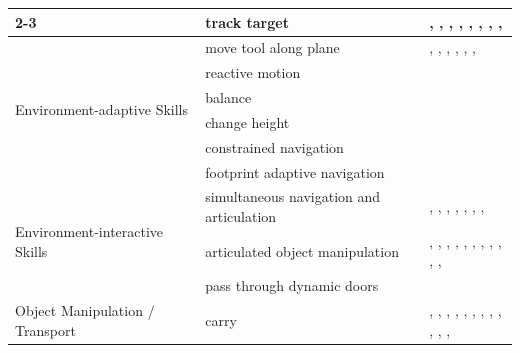 \begin{table}[p]
\begin{tabular}{|p{4cm}|p{5cm}|p{15cm}|}
\cline{2-3}
    & track target                             & \cite{Donald2024AnAF}, \cite{Weser2009AutonomousPF}, \cite{Pedersen2015GestureBasedEO}, \cite{Stckler2009IntegratingIM}, \cite{Kenney2009InteractiveSF}, \cite{Pedersen2014IntuitiveSP}, \cite{Arm2024PedipulateEM}, \cite{Lim2019SkillbasedAA}, \cite{Chang2006ABB} \\
\hline
\multirow{6}{*}{\parbox{4cm}{Environment-adaptive Skills}}
    & move tool along plane                    & \cite{Li2022BEHAVIOR1KAB}, \cite{Huang2013BehaviorB}, \cite{Groth2013MultitaskingOC}, \cite{Li2020PatternAA}, \cite{Lim2008MultipleHC}, \cite{Kotecha2024AHM}, \cite{Fu2024MobileAL} \\
\cline{2-3}
    & reactive motion                          & \cite{Zhao2025ReactiveWL} \\
\cline{2-3}
    & balance                                  & \cite{Schwarz2016HybridDL} \\
\cline{2-3}
    & change height                            & \cite{Ding2022IntelligentAF} \\
\cline{2-3}
    & constrained navigation                   & \cite{Hornung2012NavigationIT} \\
\cline{2-3}
    & footprint adaptive navigation            & \cite{Hornung2012NavigationIT} \\
\hline
\multirow{3}{*}{\parbox{4cm}{Environment-interactive Skills}}
    & simultaneous navigation and articulation & \cite{Scholz2011CartPW}, \cite{Rigo2022ContactOF}, \cite{Stckler2009IntegratingIM}, \cite{Settimi2016MotionPB}, \cite{Confente2025SkinMachineIW}, \cite{Bertoncelli2020LinearTM}, \cite{Dadiotis2025DynamicOG}, \cite{Fu2024MobileAL} \\
\cline{2-3}
    & articulated object manipulation          & \cite{Huang2013BehaviorB}, \cite{Arm2024PedipulateEM}, \cite{Lim2008MultipleHC}, \cite{Huang2023SkillTA}, \cite{Karumanchi2017TeamRS}, \cite{Huang2008ACB}, \cite{Petersson1999AHC}, \cite{Huang2008AnAB}, \cite{engelbracht2024spotlightroboticsceneunderstanding}, \cite{Shan2026DockAnywhereDV}, \cite{Fu2024MobileAL}, \cite{Zhang2025AgentWorldAI} \\
\cline{2-3}
    & pass through dynamic doors               & \cite{Gray2013ASP} \\
\hline
\multirow{5}{*}{\parbox{3cm}{Object Manipulation / Transport}}
    & carry                                    & \cite{Yamazaki2012HomeAssistantRF}, \cite{Ding2022IntelligentAF}, \cite{Arm2024PedipulateEM}, \cite{Lee2018PlanningAC}, \cite{Stuckler2012RoboCupHomeDE}, \cite{Cohen2012SearchbasedPF}, \cite{Lim2008MultipleHC}, \cite{Sequeira2000BehaviourbasedCB}, \cite{Waarsing2001IntroducingRI}, \cite{Pimentel2002OnTD}, \cite{Kim2022LearningAG}, \cite{Urbaniak2025ObstacleAU}, \cite{Kumbhar2025MPCQPBasedCF} \\

\end{tabular}
\end{table}
